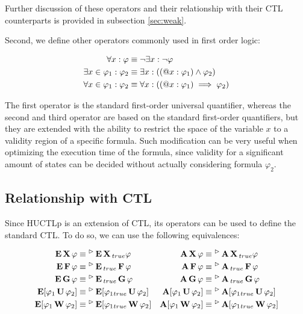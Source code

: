 Further discussion of these operators and their relationship with their \ac{CTL} counterparts is provided in subsection \ref{sec:weak}.

Second, we define other operators commonly used in first order logic:

\begin{align*}
	\forall x : \varphi 		   		& \equiv \neg \exists x : \neg \varphi \\
	\exists x \in \varphi_1 : \varphi_2 & \equiv \exists x : ((\operatorname{@\!} x : \varphi_1) \land \varphi_2) \\
	\forall x \in \varphi_1 : \varphi_2  & \equiv \forall x : ((\operatorname{@\!} x : \varphi_1) \implies \varphi_2) \\
\end{align*}

The first operator is the standard first-order universal quantifier, whereas the second and third operator are based on the standard first-order quantifiers, but they are extended with the ability to restrict the space of the variable $x$ to a validity region of a specific formula. Such modification can be very useful when optimizing the execution time of the formula, since validity for a significant amount of states can be decided without actually considering formula $\varphi_2$.

\subsection{Relationship with \ac{CTL}}

Since \ac{HUCTLp} is an extension of \ac{CTL}, its operators can be used to define the standard \ac{CTL}. To do so, we can use the following equivalences:

 \begin{align*}
 \operatorname{\mathbf{E}}\operatorname{\mathbf{X}} \varphi							& \equiv {}^\vartriangleright\operatorname{\mathbf{E}}\operatorname{\mathbf{X}}{}_{true} \varphi &
 \operatorname{\mathbf{A}}\operatorname{\mathbf{X}} \varphi							& \equiv {}^\vartriangleright\operatorname{\mathbf{A}}\operatorname{\mathbf{X}}{}_{true} \varphi \\ 
 \operatorname{\mathbf{E}}\operatorname{\mathbf{F}} \varphi							& \equiv {}^\vartriangleright\operatorname{\mathbf{E}}{}_{true}\operatorname{\mathbf{F}} \varphi &
 \operatorname{\mathbf{A}}\operatorname{\mathbf{F}} \varphi							& \equiv {}^\vartriangleright\operatorname{\mathbf{A}}{}_{true}\operatorname{\mathbf{F}} \varphi \\ 
 \operatorname{\mathbf{E}}\operatorname{\mathbf{G}} \varphi							& \equiv {}^\vartriangleright\operatorname{\mathbf{E}}{}_{true}\operatorname{\mathbf{G}} \varphi &
 \operatorname{\mathbf{A}}\operatorname{\mathbf{G}} \varphi							& \equiv {}^\vartriangleright\operatorname{\mathbf{A}}{}_{true}\operatorname{\mathbf{G}} \varphi \\ 
 \operatorname{\mathbf{E}}[\varphi_1 \operatorname{\mathbf{U}} \varphi_2] 	 & \equiv {}^\vartriangleright\operatorname{\mathbf{E}}[\varphi_1 {}_{true}\operatorname{\mathbf{U}} \varphi_2] &
 \operatorname{\mathbf{A}}[\varphi_1 \operatorname{\mathbf{U}} \varphi_2] 	 & \equiv {}^\vartriangleright\operatorname{\mathbf{A}}[\varphi_1 {}_{true}\operatorname{\mathbf{U}} \varphi_2] \\
 \operatorname{\mathbf{E}}[\varphi_1 \operatorname{\mathbf{W}} \varphi_2] 	 & \equiv {}^\vartriangleright\operatorname{\mathbf{E}}[\varphi_1 {}_{true}\operatorname{\mathbf{W}} \varphi_2] &
 \operatorname{\mathbf{A}}[\varphi_1 \operatorname{\mathbf{W}} \varphi_2] 	 & \equiv {}^\vartriangleright\operatorname{\mathbf{A}}[\varphi_1 {}_{true}\operatorname{\mathbf{W}} \varphi_2] \\
 \end{align*}
 
